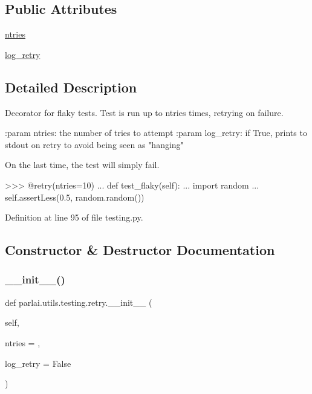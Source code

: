 \subsection*{Public Attributes}
\begin{DoxyCompactItemize}
\item 
\hyperlink{classparlai_1_1utils_1_1testing_1_1retry_abd5233dc28b07a53cd11347e5e44c44f}{ntries}
\item 
\hyperlink{classparlai_1_1utils_1_1testing_1_1retry_a69ead6d82dec33d05ba94a3d561e6dfc}{log\+\_\+retry}
\end{DoxyCompactItemize}


\subsection{Detailed Description}
\begin{DoxyVerb}Decorator for flaky tests. Test is run up to ntries times, retrying on failure.

:param ntries:
    the number of tries to attempt
:param log_retry:
    if True, prints to stdout on retry to avoid being seen as "hanging"

On the last time, the test will simply fail.

>>> @retry(ntries=10)
... def test_flaky(self):
...     import random
...     self.assertLess(0.5, random.random())
\end{DoxyVerb}
 

Definition at line 95 of file testing.\+py.



\subsection{Constructor \& Destructor Documentation}
\mbox{\label{classparlai_1_1utils_1_1testing_1_1retry_afa31eb1816cd31f1a22747e7289747c6}} 
\subsubsection{\texorpdfstring{\+\_\+\+\_\+init\+\_\+\+\_\+()}{\_\_init\_\_()}}
{\footnotesize\ttfamily def parlai.\+utils.\+testing.\+retry.\+\_\+\+\_\+init\+\_\+\+\_\+ (\begin{DoxyParamCaption}\item[{}]{self,  }\item[{}]{ntries = {},  }\item[{}]{log\+\_\+retry = {\ttfamily False} }\end{DoxyParamCaption})}



